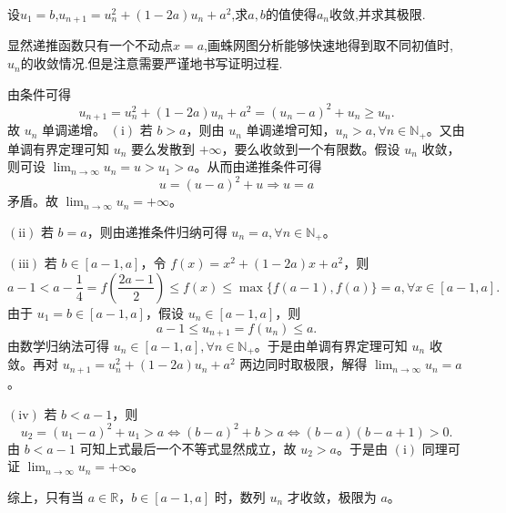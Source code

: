 \documentclass[lang=cn,newtx,10pt,scheme=chinese]{elegantbook}
\begin{document}
\begin{example}
设\(u_1 = b\),\(u_{n + 1}=u_{n}^{2}+(1 - 2a)u_{n}+a^{2}\),求$a,b$的值使得$a_n$收敛,并求其极限.
\end{example}
\begin{note}
显然递推函数只有一个不动点$x=a$,画蛛网图分析能够快速地得到取不同初值时,$u_n$的收敛情况.但是注意需要严谨地书写证明过程.
\end{note}
\begin{solution}
由条件可得
\[
u_{n + 1}=u_{n}^{2}+(1 - 2a)u_n + a^2=(u_n - a)^2 + u_n\geqslant u_n.
\]
故 \(u_n\) 单调递增。 
\((\mathrm{i})\) 若 \(b > a\)，则由 \(u_n\) 单调递增可知，\(u_n > a,\forall n\in \mathbb{N}_+\)。又由单调有界定理可知 \(u_n\) 要么发散到 \(+\infty\)，要么收敛到一个有限数。假设 \(u_n\) 收敛，则可设 \(\lim_{n\rightarrow \infty}u_n = u > u_1 > a\)。从而由递推条件可得
\[
u=(u - a)^2 + u\Rightarrow u = a
\]
矛盾。故 \(\lim_{n\rightarrow \infty}u_n = +\infty\)。

\((\mathrm{ii})\) 若 \(b = a\)，则由递推条件归纳可得 \(u_n = a,\forall n\in \mathbb{N}_+\)。

\((\mathrm{iii})\) 若 \(b\in [a - 1,a]\)，令 \(f(x)=x^2+(1 - 2a)x + a^2\)，则
\[
a - 1 < a - \frac{1}{4}=f\left(\frac{2a - 1}{2}\right)\leqslant f(x)\leqslant \max\{f(a - 1),f(a)\}=a,\forall x\in [a - 1,a].
\]
由于 \(u_1 = b\in [a - 1,a]\)，假设 \(u_n\in [a - 1,a]\)，则
\[
a - 1\leqslant u_{n + 1}=f(u_n)\leqslant a.
\]
由数学归纳法可得 \(u_n\in [a - 1,a],\forall n\in \mathbb{N}_+\)。于是由单调有界定理可知 \(u_n\) 收敛。再对 \(u_{n + 1}=u_{n}^{2}+(1 - 2a)u_n + a^2\) 两边同时取极限，解得 \(\lim_{n\rightarrow \infty}u_n = a\)。

\((\mathrm{iv})\) 若 \(b < a - 1\)，则
\[
u_2=(u_1 - a)^2 + u_1 > a\Leftrightarrow (b - a)^2 + b > a\Leftrightarrow (b - a)(b - a + 1) > 0.
\]
由 \(b < a - 1\) 可知上式最后一个不等式显然成立，故 \(u_2 > a\)。于是由 \((\mathrm{i})\) 同理可证 \(\lim_{n\rightarrow \infty}u_n = +\infty\)。

综上，只有当 \(a\in \mathbb{R}\)，\(b\in [a - 1,a]\) 时，数列 \(u_n\) 才收敛，极限为 \(a\)。
\end{solution}
\end{document}
